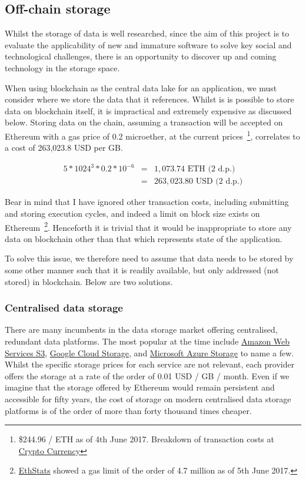 \subsection{Off-chain storage}

Whilst the storage of data is well researched, since the aim of this project is to evaluate the applicability of new and immature software to solve key social and technological challenges, there is an opportunity to discover up and coming technology in the storage space.

When using blockchain as the central data lake for an application, we must consider where we store the data that it references. Whilst is is possible to store data on blockchain itself, it is impractical and extremely expensive as discussed below. Storing data on the chain, assuming a transaction will be accepted on Ethereum with a gas price of 0.2 microether, at the current prices~\footnote{\$244.96 / ETH as of 4th June 2017. Breakdown of transaction costs at \href{https://www.cryptocompare.com/coins/guides/what-is-the-gas-in-ethereum/}{Crypto Currency}}, correlates to a cost of 263,023.8 USD per GB.

$$
\begin{aligned}
5 * 1024^{3} * 0.2 * 10^{-6} &=& 1,073.74 \text{ ETH (2 d.p.)} \\
&=& 263,023.80 \text{ USD (2 d.p.)}
\end{aligned}
$$

Bear in mind that I have ignored other transaction costs, including submitting and storing execution cycles, and indeed a limit on block size exists on Ethereum~\footnote{\href{https://ethstats.net/}{EthStats} showed a gas limit of the order of 4.7 million as of 5th June 2017.}. Henceforth it is trivial that it would be inappropriate to store any data on blockchain other than that which represents state of the application.

To solve this issue, we therefore need to assume that data needs to be stored by some other manner such that it is readily available, but only addressed (not stored) in blockchain. Below are two solutions.

\subsubsection{Centralised data storage}

There are many incumbents in the data storage market offering centralised, redundant data platforms. The most popular at the time include \href{https://aws.amazon.com/s3/}{Amazon Web Services S3}, \href{https://cloud.google.com/storage/}{Google Cloud Storage}, and \href{https://azure.microsoft.com/en-gb/services/storage/}{Microsoft Azure Storage} to name a few. Whilst the specific storage prices for each service are not relevant, each provider offers the storage at a rate of the order of 0.01 USD / GB / month. Even if we imagine that the storage offered by Ethereum would remain persistent and accessible for fifty years, the cost of storage on modern centralised data storage platforms is of the order of more than forty thousand times cheaper.

